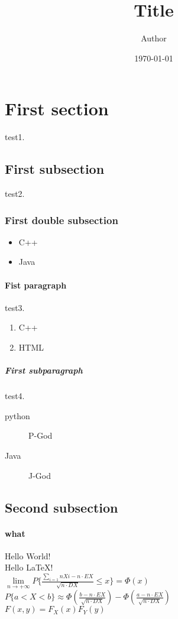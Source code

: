 \documentclass{article}
\author {Author}
\title {Title}%
\date{\today}
\begin{document}
\maketitle
\section{First section} test1.%
    \subsection{First subsection} test2.%
        \subsubsection{First double subsection}%
        \begin{itemize}
          \item C++
          \item Java
        \end{itemize}
            \paragraph{Fist paragraph} test3.%
            \begin{enumerate}
              \item C++
              \item HTML
            \end{enumerate}
                \subparagraph{First subparagraph} test4.%
                \begin{description}%
                  \item[python] P-God
                  \item[Java] J-God
                \end{description}
    \subsection{Second subsection}%
        \paragraph{what\\}
Hello World! \\ %
Hello \LaTeX ! \\

$\lim\limits_{n \rightarrow +\infty} P\lbrace\frac{\sum\limits_{i=1}{n}Xi - n\cdot EX}{ \sqrt{n \cdot DX} }  \leqslant x\rbrace = \Phi(x)$ \\

$P\lbrace a<X<b \rbrace \approx \Phi(\frac{b - n\cdot EX}{\sqrt {n\cdot DX}}) - \Phi(\frac{a - n\cdot EX}{\sqrt{n\cdot DX} })$ \\

$F(x,y) = F_{X}(x)F_{Y}(y)$
\end{document}
